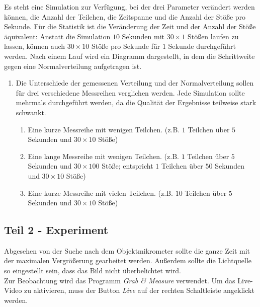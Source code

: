 \documentclass[a4paper, 12pt]{scrartcl}
\begin{document}
Es steht eine Simulation zur Verfügung, bei der drei Parameter verändert werden können, die Anzahl der Teilchen, die Zeitspanne und die Anzahl der Stöße pro Sekunde. Für die Statistik ist die Veränderung der Zeit und der Anzahl der Stöße äquivalent: Anstatt die Simulation $10$ Sekunden mit $30\times1$ Stößen laufen zu lassen, können auch $30\times10$ Stöße pro Sekunde für $1$ Sekunde durchgeführt werden. Nach einem Lauf wird ein Diagramm dargestellt, in dem die Schrittweite gegen eine Normalverteilung aufgetragen ist.\\
\begin{enumerate}

    \item Die Unterschiede der gemessenen Verteilung und der Normalverteilung sollen für drei verschiedene Messreihen verglichen werden. Jede Simulation sollte mehrmals durchgeführt werden, da die Qualität der Ergebnisse teilweise stark schwankt.

    \begin{enumerate}

      \item Eine kurze Messreihe mit wenigen Teilchen. (z.B. $1$ Teilchen über $5$ Sekunden und $30\times10$ Stöße)

      \item Eine lange Messreihe mit wenigen Teilchen. (z.B. $1$ Teilchen über $5$ Sekunden und $30\times100$ Stöße; entspricht $1$ Teilchen über $50$ Sekunden und $30\times10$ Stöße)

      \item Eine kurze Messreihe mit vielen Teilchen. (z.B. $10$ Teilchen über $5$ Sekunden und $30\times10$ Stöße)

    \end{enumerate}

\end{enumerate}


\subsection*{Teil 2 - Experiment}

Abgesehen von der Suche nach dem Objektmikrometer sollte die ganze Zeit mit der maximalen Vergrößerung gearbeitet werden. Außerdem sollte die Lichtquelle so eingestellt sein, dass das Bild nicht überbelichtet wird. \\
Zur Beobachtung wird das Programm \emph{Grab \& Measure} verwendet. Um das Live-Video zu aktivieren, muss der Button \emph{Live} auf der rechten Schaltleiste angeklickt werden.
\end{document}
